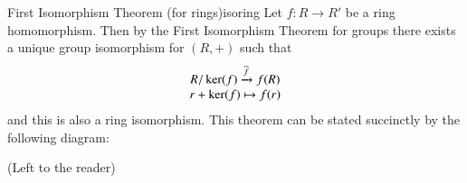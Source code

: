 \documentclass[12pt, a4paper, twoside, openright, titlepage]{book}
\begin{document}
\begin{namthm}{First Isomorphism Theorem (for rings)}{isoring}
    Let $f:R\rightarrow R'$ be a ring homomorphism. Then by the First Isomorphism Theorem for groups there exists a unique group isomorphism for $(R,+)$ such that \begin{equation}
        \begin{array}{c} R/\ker(f) \xrightarrow{\overline{f}}f(R) \\ r+\ker(f) \mapsto f(r) \end{array}
    \end{equation}
    and this is also a ring isomorphism. This theorem can be stated succinctly by the following diagram:
    \begin{center}
        \end{center}
\end{namthm}
\begin{proof*}{}{}
    (Left to the reader)
\end{proof*}
\end{document}
